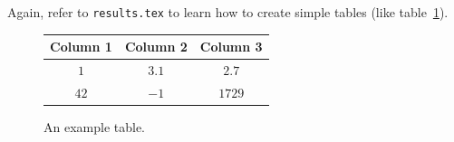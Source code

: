 Again, refer to \texttt{results.tex} to learn how to create simple
tables (like table~\ref{tab:example}).
\begin{figure}[htb]
  \centering %

  \begin{tabular}{|c|c|c|} 
    \hline \hline %
    Column 1 & Column 2 & Column 3 \\ %
    \hline %
    $1$ & $3.1$ & $2.7$ \\
    $42$ & $-1$ & $1729$\\
    \hline \hline
  \end{tabular}

  \caption{An example table.}
  \label{tab:example}

\end{figure}

